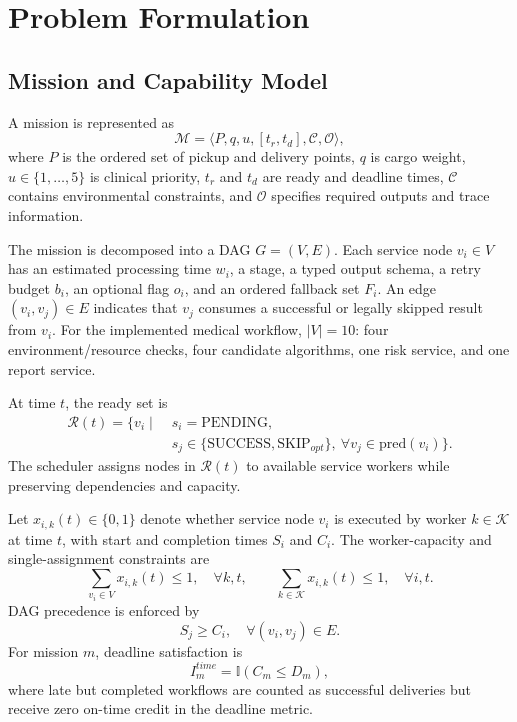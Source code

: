 \documentclass[conference]{IEEEtran}
\begin{document}
\section{Problem Formulation}

\subsection{Mission and Capability Model}

A mission is represented as
\begin{equation}
\mathcal{M} =
\langle P, q, u, [t_r,t_d], \mathcal{C}, \mathcal{O} \rangle ,
\label{eq:mission}
\end{equation}
where $P$ is the ordered set of pickup and delivery points, $q$ is cargo
weight, $u\in\{1,\ldots,5\}$ is clinical priority, $t_r$ and $t_d$ are ready
and deadline times, $\mathcal{C}$ contains environmental constraints, and
$\mathcal{O}$ specifies required outputs and trace information.

The mission is decomposed into a DAG $G=(V,E)$. Each service node
$v_i\in V$ has an estimated processing time $w_i$, a stage, a typed output
schema, a retry budget $b_i$, an optional flag $o_i$, and an ordered fallback
set $F_i$. An edge $(v_i,v_j)\in E$ indicates that $v_j$ consumes a successful
or legally skipped result from $v_i$. For the implemented medical workflow,
$|V|=10$: four environment/resource checks, four candidate algorithms, one
risk service, and one report service.

At time $t$, the ready set is
\begin{equation}
\begin{aligned}
\mathcal{R}(t)=\{v_i\mid\;&s_i=\mathrm{PENDING},\\
&s_j\in\{\mathrm{SUCCESS},\mathrm{SKIP}_{opt}\},\
\forall v_j\in\mathrm{pred}(v_i)\}.
\end{aligned}
\label{eq:ready}
\end{equation}
The scheduler assigns nodes in $\mathcal{R}(t)$ to available service workers
while preserving dependencies and capacity.

Let $x_{i,k}(t)\in\{0,1\}$ denote whether service node $v_i$ is executed by
worker $k\in\mathcal{K}$ at time $t$, with start and completion times
$S_i$ and $C_i$. The worker-capacity and single-assignment constraints are
\begin{equation}
\sum_{v_i\in V} x_{i,k}(t)\leq 1,\quad \forall k,t,
\qquad
\sum_{k\in\mathcal{K}} x_{i,k}(t)\leq 1,\quad \forall i,t .
\label{eq:capacity}
\end{equation}
DAG precedence is enforced by
\begin{equation}
S_j \geq C_i,\quad \forall (v_i,v_j)\in E .
\label{eq:precedence}
\end{equation}
For mission $m$, deadline satisfaction is
\begin{equation}
I_m^{time}=\mathbb{I}(C_m\leq D_m),
\label{eq:deadline}
\end{equation}
where late but completed workflows are counted as successful deliveries but
receive zero on-time credit in the deadline metric.
\end{document}
